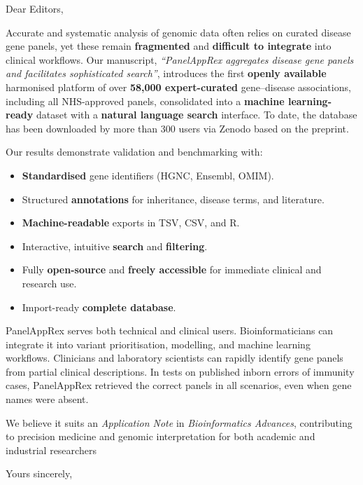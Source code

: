 \documentclass[12pt,a4paper]{letter}
\begin{document}
 

\begin{letter}{Dear Editors,}

\opening{}

Accurate and systematic analysis of genomic data often relies on curated disease gene panels, yet these remain \textbf{fragmented} and \textbf{difficult to integrate} into clinical workflows. Our manuscript, \textit{``PanelAppRex aggregates disease gene panels and facilitates sophisticated search''}, introduces the first \textbf{openly available} harmonised platform of over \textbf{58,000 expert-curated} gene–disease associations, including all NHS-approved panels, consolidated into a \textbf{machine learning-ready} dataset with a \textbf{natural language search} interface. To date, the database has been downloaded by more than 300 users via Zenodo based on the preprint.


Our results demonstrate validation and benchmarking with:
\begin{itemize}
\item \textbf{Standardised} gene identifiers (HGNC, Ensembl, OMIM).
\item Structured \textbf{annotations} for inheritance, disease terms, and literature.
\item \textbf{Machine-readable} exports in TSV, CSV, and R.
\item Interactive, intuitive \textbf{search} and \textbf{filtering}.
\item Fully \textbf{open-source} and \textbf{freely accessible} for immediate clinical and research use.
\item Import-ready \textbf{complete database}.
\end{itemize}

PanelAppRex serves both technical and clinical users. Bioinformaticians can integrate it into variant prioritisation, modelling, and machine learning workflows. Clinicians and laboratory scientists can rapidly identify gene panels from partial clinical descriptions. In tests on published inborn errors of immunity cases, PanelAppRex retrieved the correct panels in all scenarios, even when gene names were absent.

We believe it suits an \textit{Application Note} in \textit{Bioinformatics Advances}, contributing to precision medicine and genomic interpretation for both academic and industrial researchers

\closing{Yours sincerely,}

\end{letter}
\end{document}
